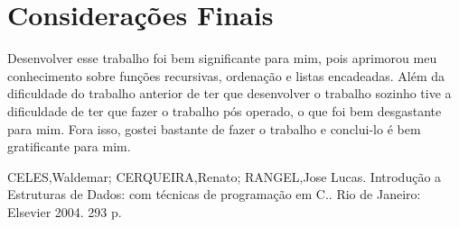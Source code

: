 \documentclass{article}
\begin{document}
\section{Considerações Finais}
Desenvolver esse trabalho foi bem significante para mim, pois aprimorou meu conhecimento sobre funções recursivas, ordenação e listas encadeadas. Além da dificuldade do trabalho anterior de ter que desenvolver o trabalho sozinho tive a dificuldade de ter que fazer o trabalho pós operado, o que foi bem desgastante para mim. Fora isso, gostei bastante de fazer o trabalho e conclui-lo é bem gratificante para mim.


CELES,Waldemar; CERQUEIRA,Renato; RANGEL,Jose Lucas. Introdução a Estruturas de
Dados: com técnicas de programação em C.. Rio de Janeiro: Elsevier 2004. 293 p.
\end{document}
